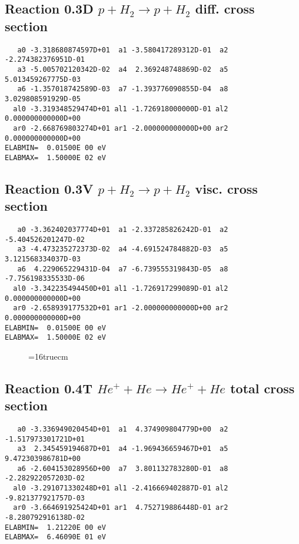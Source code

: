 \documentclass[12pt]{article}
\begin{document}
\subsection{
Reaction 0.3D   $ p + H_2 \rightarrow p + H_2 $  diff. cross section
}


\begin{small}\begin{verbatim}
   a0 -3.318680874597D+01  a1 -3.580417289312D-01  a2 -2.274382376951D-01
   a3 -5.005702120342D-02  a4  2.369248748869D-02  a5  5.013459267775D-03
   a6 -1.357018742589D-03  a7 -1.393776090855D-04  a8  3.029808591929D-05
  al0 -3.319348529474D+01 al1 -1.726918000000D-01 al2  0.000000000000D+00
  ar0 -2.668769803274D+01 ar1 -2.000000000000D+00 ar2  0.000000000000D+00 
ELABMIN=  0.01500E 00 eV
ELABMAX=  1.50000E 02 eV
\end{verbatim}\end{small}

\subsection{
Reaction 0.3V   $  p + H_2 \rightarrow p + H_2  $ visc. cross section
}


\begin{small}\begin{verbatim}
   a0 -3.362402037774D+01  a1 -2.337285826242D-01  a2 -5.404526201247D-02
   a3 -4.473235272373D-02  a4 -4.691524784882D-03  a5  3.121568334037D-03
   a6  4.229065229431D-04  a7 -6.739555319843D-05  a8 -7.756198335533D-06
  al0 -3.342235494450D+01 al1 -1.726917299089D-01 al2  0.000000000000D+00
  ar0 -2.658939177532D+01 ar1 -2.000000000000D+00 ar2  0.000000000000D+00 
ELABMIN=  0.01500E 00 eV
ELABMAX=  1.50000E 02 eV
\end{verbatim}\end{small}


\begin{figure} \label{0.3}
\epsfxsize=16truecm
\end{figure}
\newpage


\subsection{
Reaction 0.4T   $  He^+ + He \rightarrow He^+ + He $  total cross section
}



\begin{small}\begin{verbatim}
   a0 -3.336949020454D+01  a1  4.374909804779D+00  a2 -1.517973301721D+01
   a3  2.345459194687D+01  a4 -1.969436659467D+01  a5  9.472303986781D+00
   a6 -2.604153028956D+00  a7  3.801132783280D-01  a8 -2.282922057203D-02
  al0 -3.291071330248D+01 al1 -2.416669402887D-01 al2 -9.821377921757D-03
  ar0 -3.664691925424D+01 ar1  4.752719886448D-01 ar2 -8.280792916138D-02
ELABMIN=  1.21220E 00 eV
ELABMAX=  6.46090E 01 eV
\end{verbatim}\end{small}
\end{document}
